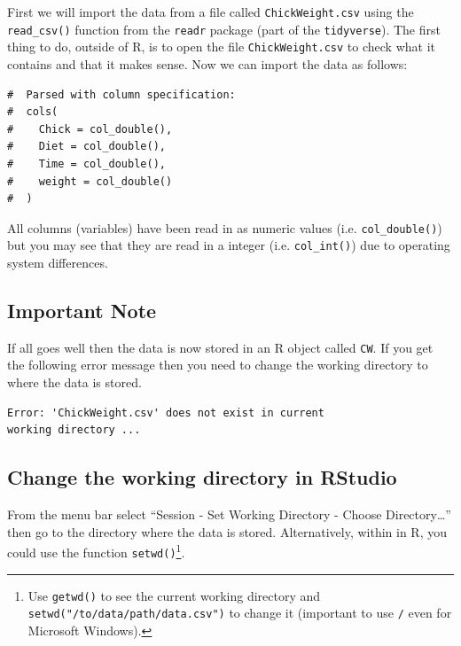 \documentclass[a4paper,9pt,twocolumn,twoside,printwatermark=false]{pinp}
\begin{document}
First we will import the data from a file called
\texttt{ChickWeight.csv} using the \texttt{read\_csv()} function from
the \texttt{readr} package (part of the \texttt{tidyverse}). The first
thing to do, outside of R, is to open the file \texttt{ChickWeight.csv}
to check what it contains and that it makes sense. Now we can import the
data as follows:

\begin{Shaded}
\begin{Highlighting}[]
\StringTok{ }\NormalTok{(}\NormalTok{)}
\end{Highlighting}
\end{Shaded}

\begin{ShadedResult}
\begin{verbatim}
#  Parsed with column specification:
#  cols(
#    Chick = col_double(),
#    Diet = col_double(),
#    Time = col_double(),
#    weight = col_double()
#  )
\end{verbatim}
\end{ShadedResult}

All columns (variables) have been read in as numeric values (i.e.
\texttt{col\_double()}) but you may see that they are read in a integer
(i.e. \texttt{col\_int()}) due to operating system differences.

\subsection{Important Note}\label{important-note}

If all goes well then the data is now stored in an R object called
\texttt{CW}. If you get the following error message then you need to
change the working directory to where the data is stored.

\begin{verbatim}
Error: 'ChickWeight.csv' does not exist in current
working directory ...
\end{verbatim}

\subsection{Change the working directory in
RStudio}\label{change-the-working-directory-in-rstudio}

From the menu bar select ``Session - Set Working Directory - Choose
Directory\ldots{}'' then go to the directory where the data is stored.
Alternatively, within in R, you could use the function
\texttt{setwd()}\footnote{Use \texttt{getwd()} to see the current
  working directory and \texttt{setwd("/to/data/path/data.csv")} to
  change it (important to use \texttt{/} even for Microsoft Windows).}.
\end{document}
